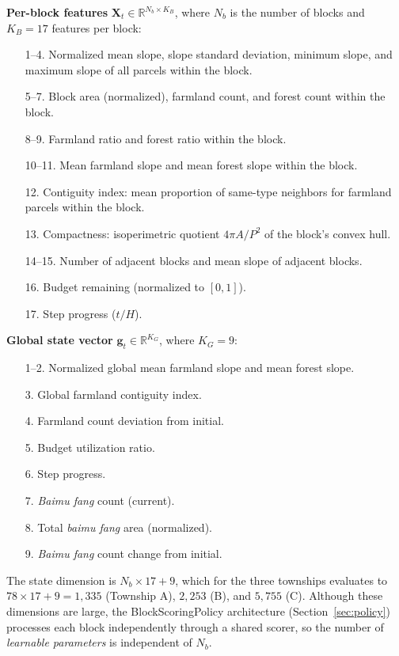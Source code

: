 \documentclass[preprint,12pt]{elsarticle}
\begin{document}
\textbf{Per-block features} $\mathbf{X}_t \in \mathbb{R}^{N_b \times K_B}$, where $N_b$ is the number of blocks and $K_B = 17$ features per block:
\begin{enumerate}
\item[1--4.] Normalized mean slope, slope standard deviation, minimum slope, and maximum slope of all parcels within the block.
\item[5--7.] Block area (normalized), farmland count, and forest count within the block.
\item[8--9.] Farmland ratio and forest ratio within the block.
\item[10--11.] Mean farmland slope and mean forest slope within the block.
\item[12.] Contiguity index: mean proportion of same-type neighbors for farmland parcels within the block.
\item[13.] Compactness: isoperimetric quotient $4\pi A / P^2$ of the block's convex hull.
\item[14--15.] Number of adjacent blocks and mean slope of adjacent blocks.
\item[16.] Budget remaining (normalized to $[0, 1]$).
\item[17.] Step progress ($t / H$).
\end{enumerate}

\textbf{Global state vector} $\mathbf{g}_t \in \mathbb{R}^{K_G}$, where $K_G = 9$:
\begin{enumerate}
\item[1--2.] Normalized global mean farmland slope and mean forest slope.
\item[3.] Global farmland contiguity index.
\item[4.] Farmland count deviation from initial.
\item[5.] Budget utilization ratio.
\item[6.] Step progress.
\item[7.] \textit{Baimu fang} count (current).
\item[8.] Total \textit{baimu fang} area (normalized).
\item[9.] \textit{Baimu fang} count change from initial.
\end{enumerate}

The state dimension is $N_b \times 17 + 9$, which for the three townships evaluates to $78 \times 17 + 9 = 1{,}335$ (Township A), $2{,}253$ (B), and $5{,}755$ (C). Although these dimensions are large, the BlockScoringPolicy architecture (Section~\ref{sec:policy}) processes each block independently through a shared scorer, so the number of \textit{learnable parameters} is independent of $N_b$.
\end{document}
